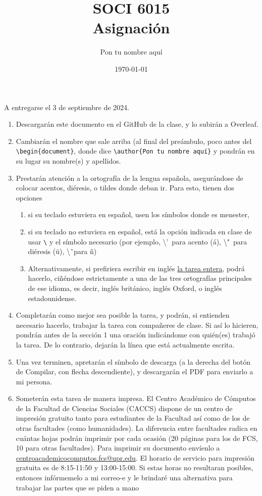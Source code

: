 \documentclass[11pt]{article}
\title{SOCI 6015\\ Asignación \textnumero 2}
\author{Pon tu nombre aquí}
\date{\today}
\begin{document}
\maketitle
\vspace{-1cm}
\begin{center}
   A entregarse el 3 de septiembre de 2024. 
\end{center}

\begin{enumerate}
    \item Descargarán este documento en el GitHub de la clase, y lo subirán a Overleaf.
    \item Cambiarán el nombre que sale arriba (al final del preámbulo, poco antes del \texttt{\textbackslash begin\{document\}}, donde dice \texttt{\textbackslash author\{Pon tu nombre aquí\}} y pondrán en su lugar su nombre(s) y apellidos.
    \item Prestarán atención a la ortografía de la lengua española, asegurándose de colocar acentos, diéresis, o tildes donde deban ir. Para esto, tienen dos opciones 
    \begin{enumerate}
         \item si su teclado estuviera en español, usen los símbolos donde es menester,
        \item si su teclado no estuviera en español, está la opción indicada en clase de usar \texttt{\textbackslash} y el símbolo necesario (por ejemplo, \textbackslash'\ para acento (\'a), \textbackslash "\  para diéresis (\"u), \textbackslash \~\ para \~n)
        \item Alternativamente, si prefiriera escribir en inglés \underline{la tarea entera}, podrá hacerlo, ciñéndose estrictamente a una de las tres ortografías principales de ese idioma, es decir, inglés británico, inglés Oxford, o inglés estadounidense.
    \end{enumerate}
    \item Completarán como mejor sea posible la tarea, y podrán, si entienden necesario hacerlo, trabajar la tarea con compañeres de clase. Si así lo hicieren, pondrán antes de la sección 1 una oración indicándome con quién(es) trabajó la tarea. De lo contrario, dejarán la línea que está actualmente escrita.
    \item  Una vez terminen, apretarán el símbolo de descarga (a la derecha del botón de Compilar, con flecha descendiente), y descargarán el PDF para enviarlo a mi persona.
    \item Someterán esta tarea de manera impresa. El Centro Académico de Cómputos de la Facultad de Ciencias Sociales (CACCS) dispone de un centro de impresión gratuito tanto para estudiantes de la Facultad así como de los de otras facultades (como humanidades). La diferencia entre facultades radica en cuántas hojas podrán imprimir por cada ocasión (20 páginas para los de FCS, 10 para otras facultades). Para imprimir su documento envíenlo a \href{mailto:centroacademicocomputos.fcs@upr.edu}{centroacademicocomputos.fcs@upr.edu}. El horario de servicio para impresión gratuita es de 8:15-11:50 y  13:00-15:00. Si estas horas no resultaran posibles, entonces infórmemelo a mi correo-e y le brindaré una alternativa para trabajar las partes que se piden a mano

\end{enumerate}
\end{document}
